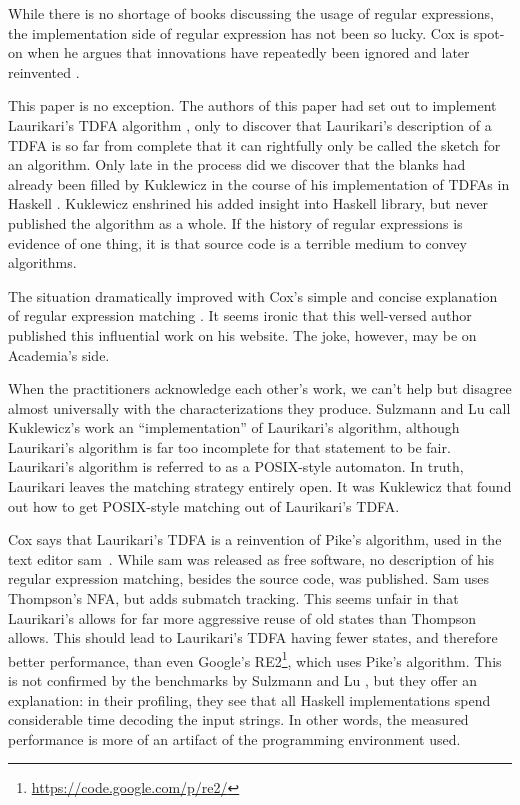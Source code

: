 \documentclass[english]{sigplanconf}
\theoremstyle{definition}
\begin{document}
While there is no shortage of books discussing the usage of regular
expressions, the implementation side of regular expression has not
been so lucky. Cox is spot-on when he argues that innovations have
repeatedly been ignored and later reinvented \cite{Cox07a,Cox09a,Cox10a}. 

This paper is no exception. The authors of this paper had set out
to implement Laurikari's TDFA algorithm \cite{Laur00a},
only to discover that Laurikari's description of a TDFA is so far
from complete that it can rightfully only be called the sketch for
an algorithm. Only late in the process did we discover that the blanks
had already been filled by Kuklewicz in the course of his implementation
of TDFAs in Haskell \cite{Kukl07a}. Kuklewicz enshrined his
added insight into Haskell library, but never published the algorithm
as a whole. If the history of regular expressions is evidence of one
thing, it is that source code is a terrible medium to convey algorithms. 

The situation dramatically improved with Cox's simple and concise
explanation of regular expression matching \cite{Cox07a}. It seems
ironic that this well-versed author published this influential work
on his website. The joke, however, may be on Academia's side.

When the practitioners acknowledge each other's work, we can't
help but disagree almost universally with the characterizations they
produce. Sulzmann and Lu \cite{Sulz12a} call Kuklewicz's
work an ``implementation'' of Laurikari's algorithm, although Laurikari's
algorithm is far too incomplete for that statement to be fair. Laurikari's
algorithm is referred to as a POSIX-style automaton. In truth, Laurikari
leaves the matching strategy entirely open. It was Kuklewicz that
found out how to get POSIX-style matching out of Laurikari's TDFA. 

Cox says that Laurikari's TDFA is a reinvention of Pike's algorithm,
used in the text editor sam~\cite{Pike87a}.  While sam was released
as free software, no description of his regular expression matching,
besides the source code, was published.  Sam uses Thompson's NFA,
but adds submatch tracking. This seems unfair in that Laurikari's
allows for far more aggressive reuse of old states than Thompson
allows. This should lead to Laurikari's TDFA having fewer states,
and therefore better performance, than even Google's
RE2\footnote{\url{https://code.google.com/p/re2/}}, which uses
Pike's algorithm.  This is not confirmed by the benchmarks by
Sulzmann and Lu \cite{Sulz12a}, but they offer an explanation: in
their profiling, they see that all Haskell implementations spend
considerable time decoding the input strings. In other words, the
measured performance is more of an artifact of the programming
environment used.
\end{document}
